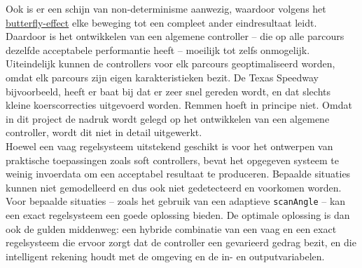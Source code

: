 \documentclass[10pt,a4paper]{article}
\begin{document}
			Ook is er een schijn van non-determinisme aanwezig, waardoor volgens het \href{https://en.wikipedia.org/wiki/Butterfly_effect}{butterfly-effect} elke beweging tot een compleet ander eindresultaat leidt. Daardoor is het ontwikkelen van een algemene controller -- die op alle parcours dezelfde acceptabele performantie heeft -- moeilijk tot zelfs onmogelijk.\\

			Uiteindelijk kunnen de controllers voor elk parcours geoptimaliseerd worden, omdat elk parcours zijn eigen karakteristieken bezit. De Texas Speedway bijvoorbeeld, heeft er baat bij dat er zeer snel gereden wordt, en dat slechts kleine koerscorrecties uitgevoerd worden. Remmen hoeft in principe niet. Omdat in dit project de nadruk wordt gelegd op het ontwikkelen van een algemene controller, wordt dit niet in detail uitgewerkt.\\

			Hoewel een vaag regelsysteem uitstekend geschikt is voor het ontwerpen van praktische toepassingen zoals soft controllers, bevat het opgegeven systeem te weinig invoerdata om een acceptabel resultaat te produceren. Bepaalde situaties kunnen niet gemodelleerd en dus ook niet gedetecteerd en voorkomen worden. Voor bepaalde situaties -- zoals het gebruik van een adaptieve \texttt{scanAngle} -- kan een exact regelsysteem een goede oplossing bieden. De optimale oplossing is dan ook de gulden middenweg: een hybride combinatie van een vaag en een exact regelsysteem die ervoor zorgt dat de controller een gevarieerd gedrag bezit, en die intelligent rekening houdt met de omgeving en de in- en outputvariabelen.
\end{document}
